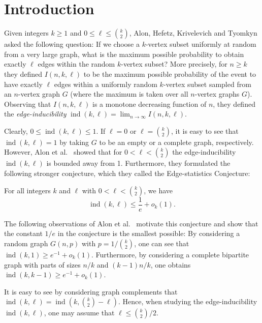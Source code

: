 \section{Introduction}

Given integers $k\geq 1$ and $0\leq \ell\leq {k\choose 2}$, Alon, Hefetz, Krivelevich and Tyomkyn \cite{alon-et-al} asked the following question: If we choose a $k$-vertex subset uniformly at random from a very large graph, what is the maximum possible probability to obtain exactly $\ell$ edges within the random $k$-vertex subset? More precisely, for $n\geq k$ they defined $I(n,k,\ell)$ to be the maximum possible probability of the event to have exactly $\ell$ edges within a uniformly random $k$-vertex subset sampled from an $n$-vertex graph $G$ (where the maximum is taken over all $n$-vertex graphs $G$). Observing that $I(n,k,\ell)$ is a monotone decreasing function of $n$, they defined the \emph{edge-inducibility} $\operatorname{ind}(k,\ell)=\lim_{n\to\infty} I(n,k,\ell)$.

Clearly, $0\leq \operatorname{ind}(k,\ell)\leq 1$. If $\ell=0$ or $\ell={k\choose 2}$, it is easy to see that $\operatorname{ind}(k,\ell)=1$ by taking $G$ to be an empty or a complete graph, respectively. However, Alon et al.\ \cite{alon-et-al} showed that for $0< \ell< {k\choose 2}$ the edge-inducibility $\operatorname{ind}(k,\ell)$ is bounded away from 1. Furthermore, they formulated the following stronger conjecture, which they called the Edge-statistics Conjecture:

\begin{conjecture}\label{conj-1-e}For all integers $k$ and $\ell$ with $0< \ell<{k\choose 2}$, we have
\[\operatorname{ind}(k,\ell)\leq \frac{1}{e}+o_k(1).\]
\end{conjecture}

The following observations of Alon et al.\ \cite{alon-et-al} motivate this conjecture and show that the constant $1/e$ in the conjecture is the smallest possible: By considering a random graph $G(n,p)$ with $p=1/{k\choose 2}$, one can see that $\operatorname{ind}(k,1)\geq  e^{-1}+o_k(1)$. Furthermore, by considering a complete bipartite graph with parts of sizes $n/k$ and $(k-1)n/k$, one obtains $\operatorname{ind}(k,k-1)\geq  e^{-1}+o_k(1)$.

It is easy to see by considering graph complements that $\operatorname{ind}(k,\ell)=\operatorname{ind}(k,{k\choose 2}-\ell)$. Hence, when studying the edge-inducibility $\operatorname{ind}(k,\ell)$, one may assume that $\ell\leq {k\choose 2}/2$.

